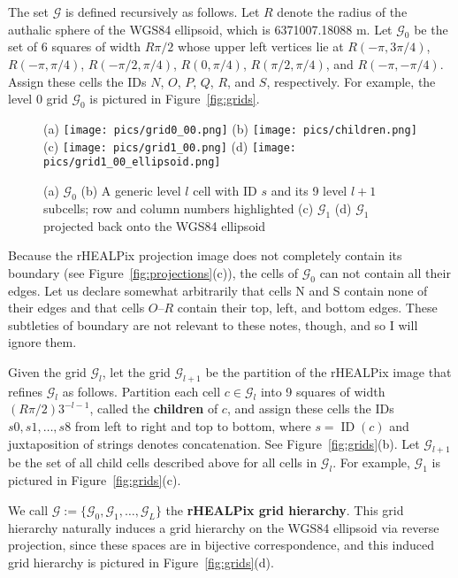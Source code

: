 \documentclass[12pt,a4paper]{amsart}
\numberwithin{figure}{section}
\newcommand{\hl}[1]{\textnormal{\textbf{#1}}} %
\newcommand{\cG}{\mathcal{G}}
\newcommand{\maxlevel}{L}
\DeclareMathOperator{\id}{ID}
\begin{document}
The set $\cG$ is defined recursively as follows.
Let $R$ denote the radius of the authalic sphere of the WGS84 ellipsoid, which is 6371007.18088 m.
Let $\cG_0$ be the set of 6 squares of width $R\pi/2$ whose upper left vertices lie at $R(-\pi, 3\pi/4)$, $R(-\pi, \pi/4)$, $R(-\pi/2, \pi/4)$, $R(0, \pi/4)$, $R(\pi/2, \pi/4)$, and $R(-\pi, -\pi/4)$.
Assign these cells the IDs $N$, $O$, $P$, $Q$, $R$, and $S$, respectively.
For example, the level 0 grid $\cG_0$ is pictured in Figure~\ref{fig:grids}.

\begin{figure}[htb]
(a) \texttt{[image: pics/grid0\_00.png]} 
(b) \texttt{[image: pics/children.png]} \\
(c) \texttt{[image: pics/grid1\_00.png]} 
(d) \texttt{[image: pics/grid1\_00\_ellipsoid.png]}
\caption{
(a) $\cG_0$ 
(b) A generic level $l$ cell with ID $s$ and its 9 level $l+1$ subcells; row and column numbers highlighted
(c) $\cG_1$
(d) $\cG_1$ projected back onto the WGS84 ellipsoid 
}
\end{figure}
\label{fig:grids}

Because the rHEALPix projection image does not completely contain its boundary (see Figure~\ref{fig:projections}(c)), the cells of $\cG_0$ can not contain all their edges.
Let us declare somewhat arbitrarily that cells N and S contain none of their edges and that cells $O$--$R$ contain their top, left, and bottom edges.
These subtleties of boundary are not relevant to these notes, though, and so I will ignore them.

Given the grid $\cG_l$, let the grid $\cG_{l+1}$ be the partition of the rHEALPix image that refines $\cG_l$ as follows.
Partition each cell $c \in \cG_l$ into 9 squares of width $(R\pi/2) 3^{-l-1}$, called the \hl{children} of $c$, and assign these cells the IDs $s  0, s  1, \ldots, s  8$ from left to right and top to bottom, where $s = \id(c)$ and $ $ juxtaposition of strings denotes concatenation.
See Figure~\ref{fig:grids}(b).
Let $\cG_{l+1}$ be the set of all child cells described above for all cells in $\cG_l$. 
For example, $\cG_1$ is pictured in Figure~\ref{fig:grids}(c).

We call $\cG := \{\cG_0, \cG_1, \ldots, \cG_\maxlevel\}$ the \hl{rHEALPix grid hierarchy}.
This grid hierarchy naturally induces a grid hierarchy on the WGS84 ellipsoid via reverse projection, since these spaces are in bijective correspondence, and this induced grid hierarchy is pictured in Figure~\ref{fig:grids}(d).
\end{document}
